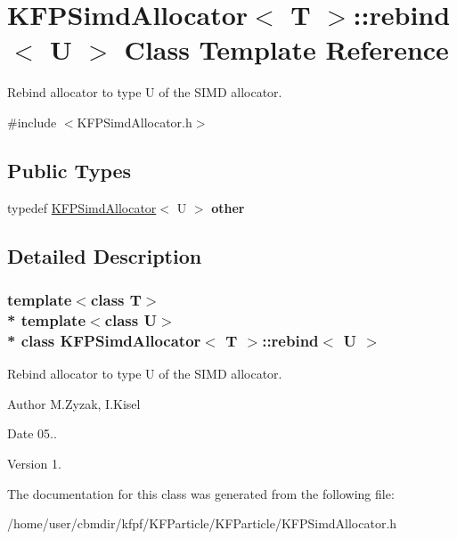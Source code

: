 \hypertarget{structKFPSimdAllocator_1_1rebind}{}\section{K\+F\+P\+Simd\+Allocator$<$ T $>$\+:\+:rebind$<$ U $>$ Class Template Reference}
\label{structKFPSimdAllocator_1_1rebind}


Rebind allocator to type U of the S\+I\+MD allocator.  




{\ttfamily \#include $<$K\+F\+P\+Simd\+Allocator.\+h$>$}

\subsection*{Public Types}
\begin{DoxyCompactItemize}
\item 
typedef \hyperlink{classKFPSimdAllocator}{K\+F\+P\+Simd\+Allocator}$<$ U $>$ {\bfseries other}\hypertarget{structKFPSimdAllocator_1_1rebind_ae576c48609ee2c4681e86f795557fc9f}{}\label{structKFPSimdAllocator_1_1rebind_ae576c48609ee2c4681e86f795557fc9f}

\end{DoxyCompactItemize}


\subsection{Detailed Description}
\subsubsection*{template$<$class T$>$\\*
template$<$class U$>$\\*
class K\+F\+P\+Simd\+Allocator$<$ T $>$\+::rebind$<$ U $>$}

Rebind allocator to type U of the S\+I\+MD allocator. 

\begin{DoxyAuthor}{Author}
M.\+Zyzak, I.\+Kisel 
\end{DoxyAuthor}
\begin{DoxyDate}{Date}
05.. 
\end{DoxyDate}
\begin{DoxyVersion}{Version}
1. 
\end{DoxyVersion}


The documentation for this class was generated from the following file\+:\begin{DoxyCompactItemize}
\item 
/home/user/cbmdir/kfpf/\+K\+F\+Particle/\+K\+F\+Particle/K\+F\+P\+Simd\+Allocator.\+h\end{DoxyCompactItemize}
